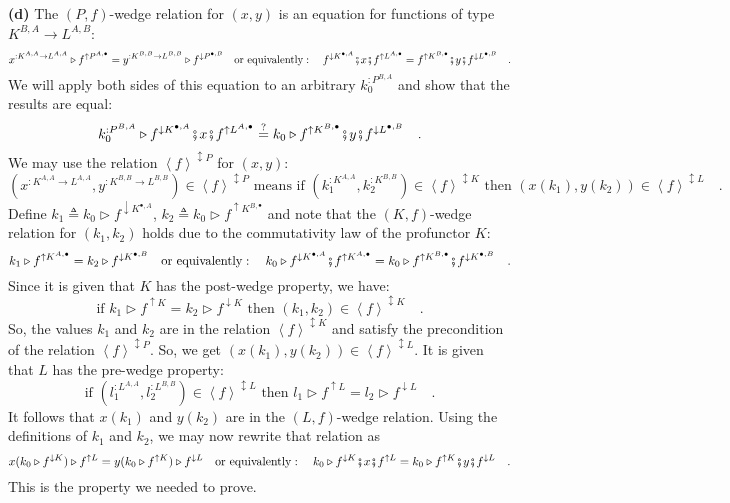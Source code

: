 \textbf{(d)} The $\left(P,f\right)$-wedge relation for $(x,y)$ is
an equation for functions of type $K^{B,A}\rightarrow L^{A,B}$:
\[
x^{:K^{A,A}\rightarrow L^{A,A}}\triangleright f^{\uparrow P^{A,\bullet}}=y^{:K^{B,B}\rightarrow L^{B,B}}\triangleright f^{\downarrow P^{\bullet,B}}\quad\text{or equivalently}:\quad f^{\downarrow K^{\bullet,A}}\bef x\bef f^{\uparrow L^{A,\bullet}}=f^{\uparrow K^{B,\bullet}}\bef y\bef f^{\downarrow L^{\bullet,B}}\quad.
\]
We will apply both sides of this equation to an arbitrary $k_{0}^{:P^{B,A}}$
and show that the results are equal:
\[
k_{0}^{:P^{B,A}}\triangleright f^{\downarrow K^{\bullet,A}}\bef x\bef f^{\uparrow L^{A,\bullet}}\overset{?}{=}k_{0}\triangleright f^{\uparrow K^{B,\bullet}}\bef y\bef f^{\downarrow L^{\bullet,B}}\quad.
\]
We may use the relation $\left<f\right>^{\updownarrow P}$ for $(x,y)$:
\[
(x^{:K^{A,A}\rightarrow L^{A,A}},y^{:K^{B,B}\rightarrow L^{B,B}})\in\left<f\right>^{\updownarrow P}\text{ means if }(k_{1}^{:K^{A,A}},k_{2}^{:K^{B,B}})\in\left<f\right>^{\updownarrow K}\text{ then }(x(k_{1}),y(k_{2}))\in\left<f\right>^{\updownarrow L}\quad.
\]
Define $k_{1}\triangleq k_{0}\triangleright f^{\downarrow K^{\bullet,A}}$,
$k_{2}\triangleq k_{0}\triangleright f^{\uparrow K^{B,\bullet}}$
and note that the $\left(K,f\right)$-wedge relation for $(k_{1},k_{2})$
holds due to the commutativity law of the profunctor $K$:
\[
k_{1}\triangleright f^{\uparrow K^{A,\bullet}}=k_{2}\triangleright f^{\downarrow K^{\bullet,B}}\quad\text{or equivalently}:\quad k_{0}\triangleright f^{\downarrow K^{\bullet,A}}\bef f^{\uparrow K^{A,\bullet}}=k_{0}\triangleright f^{\uparrow K^{B,\bullet}}\bef f^{\downarrow K^{\bullet,B}}\quad.
\]
Since it is given that $K$ has the post-wedge property, we have:
\[
\text{if }k_{1}\triangleright f^{\uparrow K}=k_{2}\triangleright f^{\downarrow K}\text{ then }(k_{1},k_{2})\in\left<f\right>^{\updownarrow K}\quad.
\]
So, the values $k_{1}$ and $k_{2}$ are in the relation $\left<f\right>^{\updownarrow K}$
and satisfy the precondition of the relation $\left<f\right>^{\updownarrow P}$.
So, we get $(x(k_{1}),y(k_{2}))\in\left<f\right>^{\updownarrow L}$.
It is given that $L$ has the pre-wedge property:
\[
\text{if }(l_{1}^{:L^{A,A}},l_{2}^{:L^{B,B}})\in\left<f\right>^{\updownarrow L}\text{ then }l_{1}\triangleright f^{\uparrow L}=l_{2}\triangleright f^{\downarrow L}\quad.
\]
It follows that $x(k_{1})$ and $y(k_{2})$ are in the $\left(L,f\right)$-wedge
relation. Using the definitions of $k_{1}$ and $k_{2}$, we may now
rewrite that relation as
\[
x(k_{0}\triangleright f^{\downarrow K})\triangleright f^{\uparrow L}=y(k_{0}\triangleright f^{\uparrow K})\triangleright f^{\downarrow L}\quad\text{or equivalently}:\quad k_{0}\triangleright f^{\downarrow K}\bef x\bef f^{\uparrow L}=k_{0}\triangleright f^{\uparrow K}\bef y\bef f^{\downarrow L}\quad.
\]
This is the property we needed to prove.

